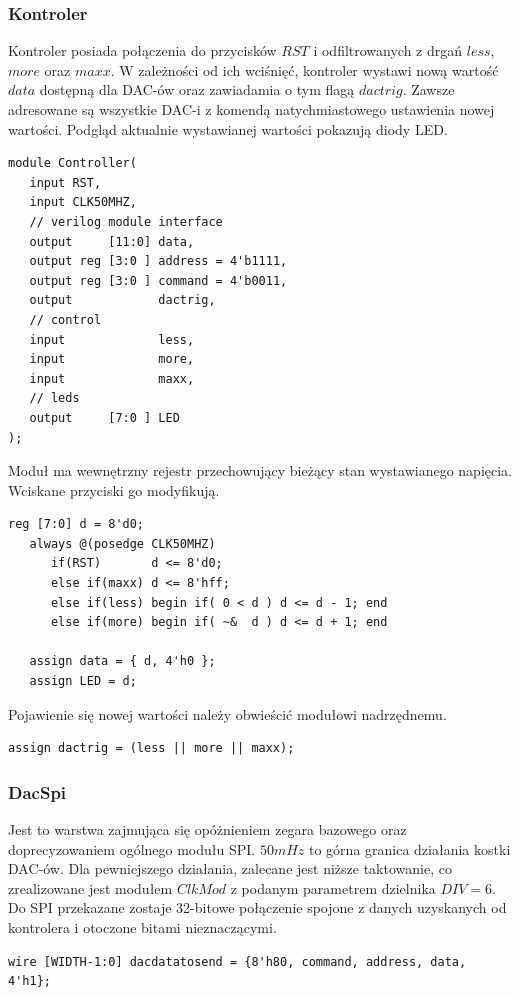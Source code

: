 \documentclass[a4paper,12pt]{article}
\begin{document}
\subsubsection{Kontroler}

Kontroler posiada połączenia do przycisków $RST$ i odfiltrowanych z drgań $less$, $more$ oraz $maxx$. W zależności od ich wciśnięć, kontroler wystawi nową wartość $data$ dostępną dla DAC-ów oraz zawiadamia o tym flagą $dactrig$. Zawsze adresowane są wszystkie DAC-i z komendą natychmiastowego ustawienia nowej wartości. Podgląd aktualnie wystawianej wartości pokazują diody LED.
\begin{lstlisting}[label=Controller,caption=Controller.v]
module Controller(
   input RST,
   input CLK50MHZ,
   // verilog module interface
   output     [11:0] data,
   output reg [3:0 ] address = 4'b1111,
   output reg [3:0 ] command = 4'b0011,
   output            dactrig,
   // control
   input             less,
   input             more,
   input             maxx,
   // leds
   output     [7:0 ] LED
);
\end{lstlisting}

Moduł ma wewnętrzny rejestr przechowujący bieżący stan wystawianego napięcia. Wciskane przyciski go modyfikują.
\begin{lstlisting}[label=Controller,caption=Controller.v,firstnumber=17]
   reg [7:0] d = 8'd0;
   always @(posedge CLK50MHZ)
      if(RST)       d <= 8'd0;
      else if(maxx) d <= 8'hff;
      else if(less) begin if( 0 < d ) d <= d - 1; end
      else if(more) begin if( ~&  d ) d <= d + 1; end

   assign data = { d, 4'h0 };
   assign LED = d;
\end{lstlisting}

Pojawienie się nowej wartości należy obwieścić modułowi nadrzędnemu.
\begin{lstlisting}[label=Controller,caption=Controller.v,firstnumber=27]
   assign dactrig = (less || more || maxx);
\end{lstlisting}

\subsubsection{DacSpi}
Jest to warstwa zajmująca się opóżnieniem zegara bazowego oraz doprecyzowaniem ogólnego modułu SPI. $50mHz$ to górna granica działania kostki DAC-ów. Dla pewniejszego działania, zalecane jest niższe taktowanie, co zrealizowane jest modułem $ClkMod$ z podanym parametrem dzielnika $DIV = 6$. Do SPI przekazane zostaje 32-bitowe połączenie spojone z danych uzyskanych od kontrolera i otoczone bitami nieznaczącymi.
\begin{lstlisting}[label=Controller,caption=Controller.v,firstnumber=32]
   wire [WIDTH-1:0] dacdatatosend = {8'h80, command, address, data, 4'h1};
\end{lstlisting}
\end{document}
